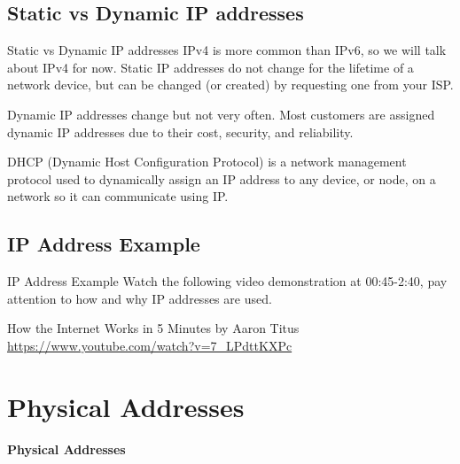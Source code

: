 \documentclass[10pt, aspectratio=43]{beamer}
\begin{document}
\subsection{Static vs Dynamic IP addresses}
\begin{frame}{Static vs Dynamic IP addresses}
    IPv4 is more common than IPv6, so we will talk about IPv4 for now.    
    Static IP addresses do not change for the lifetime of a network device, but can be changed (or created) by requesting one from your ISP. 
    
    \vspace{0.25cm}
    
    Dynamic IP addresses change but not very often. Most customers are assigned dynamic IP addresses due to their cost, security, and reliability.

    \begin{block}{}
        DHCP (Dynamic Host Configuration Protocol) is a network management protocol used to dynamically assign an IP address to any device, or node, on a network so it can communicate using IP.
    \end{block}
\end{frame}

\subsection{IP Address Example}
\begin{frame}{IP Address Example}
Watch the following video demonstration at 00:45-2:40, pay attention to how and why IP addresses are used.

\vspace{0.25cm}

\begin{example}
How the Internet Works in 5 Minutes by Aaron Titus
\url{https://www.youtube.com/watch?v=7_LPdttKXPc}
\end{example}
    
\end{frame}




\section{Physical Addresses}

\begin{frame}{}
    \centering
    \huge \textbf{Physical Addresses}
\end{frame}
\end{document}
